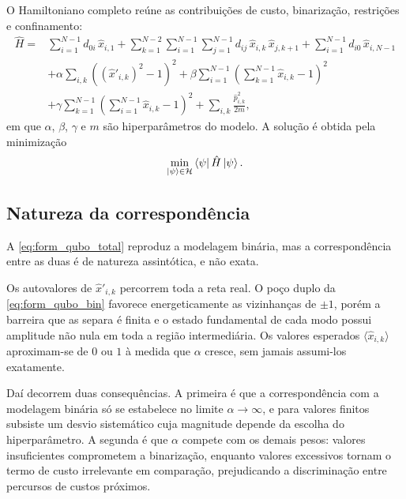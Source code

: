         O Hamiltoniano completo reúne as contribuições de custo, binarização, restrições e confinamento:
        \begin{equation}\label{eq:form_qubo_total}
            \begin{aligned}
                \hat{H} ={} & \sum_{i=1}^{N-1} d_{0i}\, \hat{x}_{i,1}
                + \sum_{k=1}^{N-2} \sum_{i=1}^{N-1} \sum_{j=1}^{N-1} d_{ij}\, \hat{x}_{i,k}\, \hat{x}_{j,k+1}
                + \sum_{i=1}^{N-1} d_{i0}\, \hat{x}_{i,N-1} \\
                & + \alpha \sum_{i,k} \left( (\hat{x}'_{i,k})^2 - 1 \right)^2
                + \beta \sum_{i=1}^{N-1} \left( \sum_{k=1}^{N-1} \hat{x}_{i,k} - 1 \right)^2 \\
                & + \gamma \sum_{k=1}^{N-1} \left( \sum_{i=1}^{N-1} \hat{x}_{i,k} - 1 \right)^2
                + \sum_{i,k} \frac{\hat{p}_{i,k}^2}{2m} ,
            \end{aligned}
        \end{equation}
        \noindent em que $\alpha$, $\beta$, $\gamma$ e $m$ são hiperparâmetros do modelo. A solução é obtida pela minimização
        \begin{equation}\label{eq:form_qubo_min}
            \min_{\ket{\psi} \in \mathcal{H}} \bra{\psi} \hat{H} \ket{\psi} .
        \end{equation}

    \subsection{Natureza da correspondência}\label{subsec:form_qubo_correspondencia}

        A \autoref{eq:form_qubo_total} reproduz a modelagem binária, mas a correspondência entre as duas é de natureza assintótica, e não exata.

        Os autovalores de $\hat{x}'_{i,k}$ percorrem toda a reta real. O poço duplo da \autoref{eq:form_qubo_bin} favorece energeticamente as vizinhanças de $\pm 1$, porém a barreira que as separa é finita e o estado fundamental de cada modo possui amplitude não nula em toda a região intermediária. Os valores esperados $\langle \hat{x}_{i,k} \rangle$ aproximam-se de $0$ ou $1$ à medida que $\alpha$ cresce, sem jamais assumi-los exatamente.

        Daí decorrem duas consequências. A primeira é que a correspondência com a modelagem binária só se estabelece no limite $\alpha \to \infty$, e para valores finitos subsiste um desvio sistemático cuja magnitude depende da escolha do hiperparâmetro. A segunda é que $\alpha$ compete com os demais pesos: valores insuficientes comprometem a binarização, enquanto valores excessivos tornam o termo de custo irrelevante em comparação, prejudicando a discriminação entre percursos de custos próximos.

